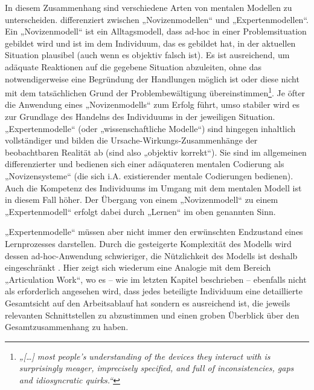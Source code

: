 In diesem Zusammenhang sind verschiedene Arten von mentalen Modellen zu unterscheiden. \citet{Seel91} differenziert zwischen „Novizenmodellen“ und „Expertenmodellen“. Ein „Novizenmodell“ ist ein Alltagsmodell, dass ad-hoc in einer Problemsituation gebildet wird und ist im dem Individuum, das es gebildet hat, in der aktuellen Situation plausibel (auch wenn es objektiv falsch ist). Es ist ausreichend, um adäquate Reaktionen auf die gegebene Situation abzuleiten, ohne das notwendigerweise eine Begründung der Handlungen möglich ist oder diese nicht mit dem tatsächlichen Grund der Problembewältigung übereinstimmen\footnote{\emph{„[\ldots] most people’s understanding of the devices they interact with is surprisingly meager, imprecisely specified, and full of inconsistencies, gaps and idiosyncratic quirks.“}\citep[][S. 8]{Norman83a}}. Je öfter die Anwendung eines „Novizenmodells“ zum Erfolg führt, umso stabiler wird es zur Grundlage des Handelns des Individuums in der jeweiligen Situation. „Expertenmodelle“ (oder „wissenschaftliche Modelle“) sind hingegen inhaltlich vollständiger und bilden die Ursache-Wirkungs-Zusammenhänge der beobachtbaren Realität ab (sind also „objektiv korrekt“). Sie sind im allgemeinen differenzierter und bedienen sich einer adäquateren mentalen Codierung als „Novizensysteme“ (die sich i.A. existierender mentale Codierungen bedienen). Auch die Kompetenz des Individuums im Umgang mit dem mentalen Modell ist in diesem Fall höher. Der Übergang von einem „Novizenmodell“ zu einem „Expertenmodell“ erfolgt dabei durch „Lernen“ im oben genannten Sinn. \citep{Ifenthaler06}

„Expertenmodelle“ müssen aber nicht immer den erwünschten Endzustand eines Lernprozesses darstellen. Durch die gesteigerte Komplexität des Modells wird dessen ad-hoc-Anwendung schwieriger, die Nützlichkeit des Modells ist deshalb eingeschränkt \citep[vgl. ][S. 20]{Ifenthaler06}. Hier zeigt sich wiederum eine Analogie mit dem Bereich „Articulation Work“, wo es -- wie im letzten Kapitel beschrieben -- ebenfalls nicht als erforderlich angesehen wird, dass jedes beteiligte Individuum eine detaillierte Gesamtsicht auf den Arbeitsablauf hat sondern es ausreichend ist, die jeweils relevanten Schnittstellen zu abzustimmen und einen groben Überblick über den Gesamtzusammenhang zu haben. 


